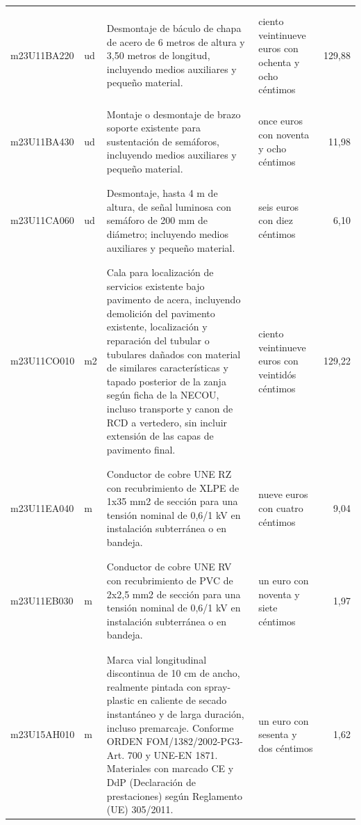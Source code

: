 \begin{supertabular}{|l|l|p{5cm}|p{3cm}|r|}
&&&&\\%
&&&&\\%
m23U11BA220&ud&Desmontaje de báculo de chapa de acero de 6 metros de altura y 3,50 metros de longitud, incluyendo medios auxiliares y pequeño material.&ciento veintinueve euros con ochenta y ocho céntimos&129,88\\%
&&&&\\%
&&&&\\%
m23U11BA430&ud&Montaje o desmontaje de brazo soporte existente para sustentación de semáforos, incluyendo medios auxiliares y pequeño material.&once euros con noventa y ocho céntimos&11,98\\%
&&&&\\%
&&&&\\%
m23U11CA060&ud&Desmontaje, hasta 4 m de altura, de señal luminosa con semáforo de 200 mm de diámetro; incluyendo medios auxiliares y pequeño material.&seis euros con diez céntimos&6,10\\%
&&&&\\%
&&&&\\%
m23U11CO010&m2&Cala para localización de servicios existente bajo pavimento de acera, incluyendo demolición del pavimento existente, localización y reparación del tubular o tubulares dañados con material de similares características y tapado posterior de la zanja según ficha de la NECOU, incluso transporte y canon de RCD a vertedero, sin incluir extensión de las capas de pavimento final.&ciento veintinueve euros con veintidós céntimos&129,22\\%
&&&&\\%
&&&&\\%
m23U11EA040&m&Conductor de cobre UNE RZ con recubrimiento de XLPE de 1x35 mm2 de sección para una tensión nominal de 0,6/1 kV en instalación subterránea o en bandeja.&nueve euros con cuatro céntimos&9,04\\%
&&&&\\%
&&&&\\%
m23U11EB030&m&Conductor de cobre UNE RV con recubrimiento de PVC de 2x2,5 mm2 de sección para una tensión nominal de 0,6/1 kV en instalación subterránea o en bandeja.&un euro con noventa y siete céntimos&1,97\\%
&&&&\\%
&&&&\\%
m23U15AH010&m&Marca vial longitudinal discontinua de 10 cm de ancho, realmente pintada con spray{-}plastic en caliente de secado instantáneo y de larga duración, incluso premarcaje. Conforme ORDEN FOM/1382/2002{-}PG3{-}Art. 700 y UNE{-}EN 1871. Materiales con marcado CE y DdP (Declaración de prestaciones) según Reglamento (UE) 305/2011.&un euro con sesenta y dos céntimos&1,62\\%

\end{supertabular}
